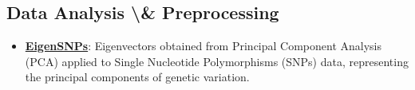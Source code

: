 \documentclass{article}%
\begin{document}
%
\subsection{Data Analysis \textbackslash{}\& Preprocessing}%
\label{subsec:DataAnalysisPreprocessing}%
\begin{itemize}[leftmargin=*]%
\item \href{https://purdue.brightspace.com/d2l/common/assets/pdfjs-d2l-dist/1.0.14-legacy/web/viewer.html?file=%2Fcontent%2Fenforced%2F1095467-wl.202510.CS.24300.001%2F11L2-svd-pca-recommender.pdf%3Fou%3D1095467&lang=en-us&container=d2l-fileviewer-rendered-pdf&fullscreen=d2l-fileviewer-rendered-pdf-dialog&height=667#page=28}{\textbf{EigenSNPs}}: Eigenvectors obtained from Principal Component Analysis (PCA) applied to Single Nucleotide Polymorphisms (SNPs) data, representing the principal components of genetic variation.%
\end{itemize}

%
\end{document}
